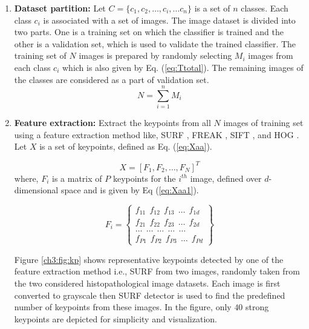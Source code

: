 \begin{enumerate}
  \item  \textbf{Dataset partition:} Let $C= \{c_1, c_2, \dots, c_i, \dots c_n\}$ is a set of $n$ classes. Each class $c_i$ is associated with a set of images. The image dataset is divided into two parts. One is a training set on which the classifier is trained and the other is a validation set, which is used to validate the trained classifier. The training set of $N$ images is prepared by randomly selecting $M_i$ images from each class $c_i$ which is also given by  Eq. (\ref{eq:Ttotal}). The remaining images of the classes are considered as a part of validation set.
\begin{equation} \label{eq:Ttotal}
N= \sum_{i=1}^n M_i
\end{equation}

  \item \textbf{Feature extraction:} Extract the keypoints from all $N$ images of training set using a feature extraction method like, SURF \cite{bay2008}, FREAK \cite{alahi2012}, SIFT \cite{lowe2004}, and HOG \cite{albiol2008}. Let $X$ is a set of keypoints, defined as Eq. (\ref{eq:Xaa}). 

\begin{equation}\label{eq:Xaa}
X= [F_1, F_2, \dots, F_N]^T
\end{equation} 
 where, $F_i$ is a matrix of  $P$ keypoints for the $i^{th}$ image, defined over $d$-dimensional space and is given by Eq (\ref{eq:Xaa1}). 

\begin{equation}\label{eq:Xaa1}
F_i=     \left\{\begin{array}{c}
f_{11} \  \ f_{12}\  \  f_{13} \ \  \dots \ \ f_{1d}\\ 
f_{21} \ \ f_{22} \ \ f_{23}  \ \ \dots  \ \ f_{2d}\\
\dots \ \ \dots \ \ \dots \ \ \dots \ \ \dots \\
f_{P1} \ \ f_{P2} \ \ f_{P3}  \ \   \dots \ \  f_{Pd}
\end{array}\right\}
\end{equation} 

Figure \ref{ch3:fig:kp} shows representative keypoints detected by one of the feature extraction method i.e., SURF from two images, randomly taken from the two considered histopathological image datasets. Each image is first converted to grayscale then SURF detector is used to find the predefined number of keypoints from these images. In the figure, only $40$ strong keypoints are depicted for simplicity and visualization.


\end{enumerate}
